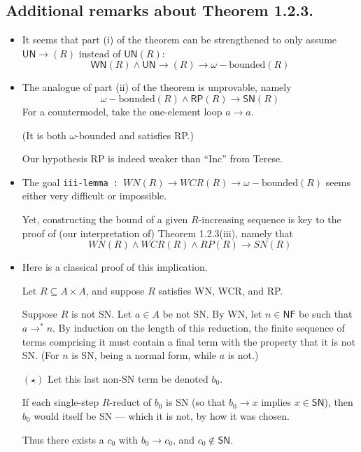 \documentclass{scrartcl}
\begin{document}
\newcommand{\RP}{\mathsf{RP}}
\newcommand{\NF}{\mathsf{NF}}
\newcommand{\UN}{\mathsf{UN}}
\newcommand{\UNto}{\mathsf{UN}{\to}}
\newcommand{\SN}{\mathsf{SN}}
\newcommand{\WN}{\mathsf{WN}}
\newcommand{\from}{\leftarrow}

\subsection*{Additional remarks about Theorem 1.2.3.}
\begin{itemize}
  \item It seems that part (i) of the theorem can be strengthened to only
  assume $\UNto(R)$ instead of $\UN(R)$:
  \[ \WN(R) \land \UNto(R) \to \omega{-}\text{bounded}(R) \tag{i} \]
  \item The analogue of part (ii) of the theorem is unprovable, namely
  \[ \omega{-}\text{bounded}(R) \land \RP(R) \to \SN(R) \tag{ii}\]
  For a countermodel, take the one-element loop $a \to a$.

  (It is both $\omega${-}bounded and satisfies RP.)

  Our hypothesis RP is indeed weaker than ``Inc'' from Terese.
  \item The goal \texttt{iii-lemma :  $WN(R) \to WCR(R) \to \omega{-}\text{bounded}(R)$}
  seems either very difficult or impossible.

  Yet, constructing the bound of a given $R$-increasing sequence is key to the proof of
  (our interpretation of) Theorem 1.2.3(iii), namely that
  \[ WN(R) \land WCR(R) \land RP(R) \to SN(R) \tag{iii} \]
  \item Here is a classical proof of this implication.

  Let $R \subseteq A \times A$, and suppose $R$ satisfies WN, WCR, and RP.

  Suppose $R$ is not SN.  Let $a \in A$ be not SN.  By WN, let $n \in \NF$ be
  such that $a \to^* n$.  By induction on the length of this reduction, the finite sequence
  of terms comprising it must contain a final term with the property that
  it is not SN.  (For $n$ is SN, being a normal form, while $a$ is not.)

  $(\star)$ Let this last non-SN term be denoted $b_0$.

  If each single-step $R$-reduct of $b_0$ is SN (so that $b_0 \to x$ implies $x\in \SN$),
  then $b_0$ would itself be SN --- which it is not, by how it was chosen.

  Thus there exists a $c_0$ with $b_0 \to c_0$, and $c_0 \notin \SN$.


\end{itemize}
\end{document}
